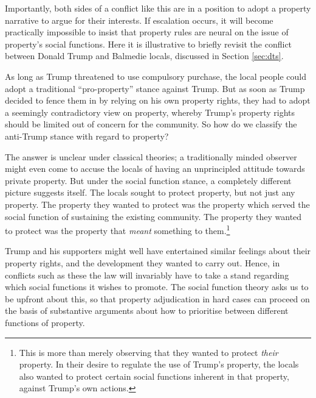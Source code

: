 Importantly, both sides of a conflict like this are in a position to adopt a property narrative to argue for their interests. If escalation occurs, it will become practically impossible to insist that  property rules are neural on the issue of property's social functions. Here it is illustrative to briefly revisit the conflict between Donald Trump and Balmedie locals, discussed in Section \ref{sec:dts}.

As long as Trump threatened to use compulsory purchase, the local people could adopt a traditional ``pro-property'' stance against Trump. But as soon as Trump decided to fence them in by relying on his own property rights, they had to adopt a seemingly contradictory view on property, whereby Trump's property rights should be limited out of concern for the community. So how do we classify the anti-Trump stance with regard to property?

The answer is unclear under classical theories; a traditionally minded observer might even come to accuse the locals of having an unprincipled attitude towards private property. But under the social function stance, a completely different picture suggests itself. The locals sought to protect property, but not just any property. The property they wanted to protect was the property which served the social function of sustaining the existing community. The property they wanted to protect was the property that {\it meant} something to them.\footnote{This is more than merely observing that they wanted to protect {\it their} property. In their desire to regulate the use of Trump's property, the locals also wanted to protect certain social functions inherent in that property, against Trump's own actions.}

Trump and his supporters might well have entertained similar feelings about their property rights, and the development they wanted to carry out. Hence, in conflicts such as these the law will invariably have to take a stand regarding which social functions it wishes to promote. The social function theory asks us to be upfront about this, so that property adjudication in hard cases can proceed on the basis of substantive arguments about how to prioritise between different functions of property.


